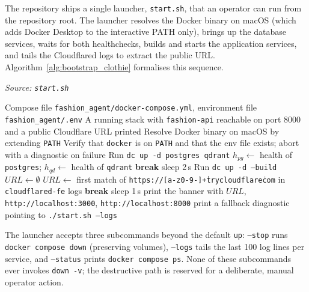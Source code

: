The repository ships a single launcher, \texttt{start.sh}, that an operator can run from the repository root. The launcher resolves the Docker binary on macOS (which adds Docker Desktop to the interactive PATH only), brings up the database services, waits for both healthchecks, builds and starts the application services, and tails the Cloudflared logs to extract the public URL. Algorithm~\ref{alg:bootstrap_clothie} formalises this sequence.

\begin{algorithm}[H]
\caption{BootstrapClothie}\label{alg:bootstrap_clothie}
\textit{Source: \texttt{start.sh}}
\begin{algorithmic}[1]
\Require Compose file \texttt{fashion\_agent/docker-compose.yml}, environment file \texttt{fashion\_agent/.env}
\Ensure A running stack with \texttt{fashion-api} reachable on port 8000 and a public Cloudflare URL printed
\State Resolve Docker binary on macOS by extending \texttt{PATH}
\State Verify that \texttt{docker} is on \texttt{PATH} and that the env file exists; abort with a diagnostic on failure
\State Run \texttt{dc up -d postgres qdrant} 
 
    \State $h_{pg} \gets$ health of \texttt{postgres}; $h_{qd} \gets$ health of \texttt{qdrant}
     \textbf{break} \EndIf
    \State sleep 2\,s
\EndFor
\State Run \texttt{dc up -d --build} 
\State $URL \gets \emptyset$
 
    \State $URL \gets$ first match of \texttt{https://[a-z0-9-]+\.trycloudflare\.com} in \texttt{cloudflared-fe} logs
     \textbf{break} \EndIf
    \State sleep 1\,s
\EndFor
{} print the banner with $URL$, \texttt{http://localhost:3000}, \texttt{http://localhost:8000}
\Else{} print a fallback diagnostic pointing to \texttt{./start.sh --logs}
\EndIf
\end{algorithmic}
\end{algorithm}

The launcher accepts three subcommands beyond the default \texttt{up}: \texttt{--stop} runs \texttt{docker compose down} (preserving volumes), \texttt{--logs} tails the last 100 log lines per service, and \texttt{--status} prints \texttt{docker compose ps}. None of these subcommands ever invokes \texttt{down -v}; the destructive path is reserved for a deliberate, manual operator action.


